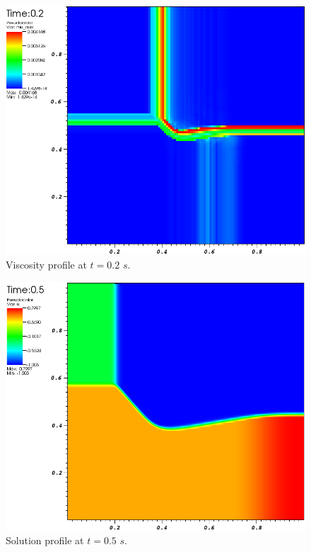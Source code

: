 %
\begin{figure}[H]
	\centering
	\includegraphics[width=\textwidth]{figures/Burger2D_visc_t0p2.png}
	\caption{Viscosity profile at $t=0.2$ $s$.}
	\label{fig:2d_burger_visc_t0p2}
\end{figure}
%
\begin{figure}[H]
	\centering
	\includegraphics[width=\textwidth]{figures/Burger2D_sol_t0p5.png}
	\caption{Solution profile at $t=0.5$ $s$.}
	\label{fig:2d_burger_sol_t0p5}
\end{figure}
%
